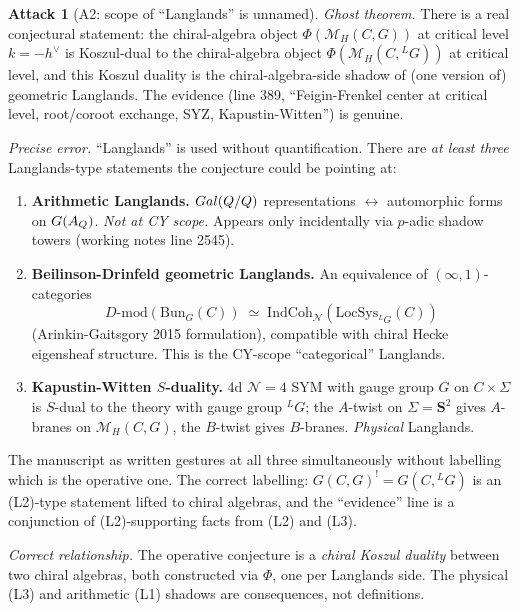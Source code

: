 \documentclass[11pt]{amsart}
\theoremstyle{definition}
\newtheorem{attack}{Attack}
\providecommand{\DMod}{D\text{-}\mathrm{mod}}
\providecommand{\cM}{\mathcal{M}}
\providecommand{\bS}{\mathbf{S}}
\providecommand{\Bun}{\mathrm{Bun}}
\providecommand{\LG}{{}^L G}
\begin{document}
\begin{attack}[A2: scope of ``Langlands'' is unnamed]\leavevmode

\noindent\emph{Ghost theorem.} There is a real conjectural statement:
the chiral-algebra object $\Phi(\cM_H(C,G))$ at critical level $k = -h^\vee$
is Koszul-dual to the chiral-algebra object $\Phi(\cM_H(C, \LG))$ at
critical level, and this Koszul duality is the chiral-algebra-side
shadow of (one version of) geometric Langlands. The evidence (line 389,
``Feigin-Frenkel center at critical level, root/coroot exchange, SYZ,
Kapustin-Witten'') is genuine.

\noindent\emph{Precise error.} ``Langlands'' is used without
quantification. There are {\em at least three} Langlands-type
statements the conjecture could be pointing at:

\begin{enumerate}[label=(L\arabic*)]
 \item \textbf{Arithmetic Langlands.} $Gal(Q/Q)$
   representations $\leftrightarrow$ automorphic forms on $G(A_{Q})$.
   {\em Not at CY scope.} Appears only incidentally via
   $p$-adic shadow towers (working notes line 2545).
 \item \textbf{Beilinson-Drinfeld geometric Langlands.} An equivalence
   of $(\infty,1)$-categories
   \[
    \DMod(\Bun_G(C)) \;\simeq\; \mathrm{IndCoh}_{\mathcal{N}}(\mathrm{LocSys}_{\LG}(C))
   \]
   (Arinkin-Gaitsgory 2015 formulation), compatible with chiral Hecke
   eigensheaf structure. This is the CY-scope ``categorical''
   Langlands.
 \item \textbf{Kapustin-Witten $S$-duality.} 4d $\mathcal{N}=4$ SYM with
   gauge group $G$ on $C \times \Sigma$ is $S$-dual to the theory with
   gauge group $\LG$; the $A$-twist on $\Sigma = \bS^2$ gives $A$-branes
   on $\cM_H(C,G)$, the $B$-twist gives $B$-branes. {\em Physical}
   Langlands.
\end{enumerate}

The manuscript as written gestures at all three simultaneously without
labelling which is the operative one. The correct labelling:
$G(C,G)^! = G(C, \LG)$ is an (L2)-type statement lifted to chiral
algebras, and the ``evidence'' line is a conjunction of
(L2)-supporting facts from (L2) and (L3).

\noindent\emph{Correct relationship.} The operative conjecture is a
\emph{chiral Koszul duality} between two chiral algebras, both
constructed via $\Phi$, one per Langlands side. The physical (L3)
and arithmetic (L1) shadows are consequences, not definitions.
\end{attack}
\end{document}
